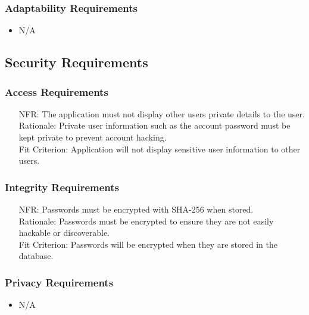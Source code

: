 \documentclass[12pt]{article}
\newcounter{nfrnum} %
\begin{document}
  \subsubsection{Adaptability Requirements}
    \noindent \begin{itemize}
		\item N/A
    \end{itemize}

\subsection{Security Requirements}
  \subsubsection{Access Requirements}
    \noindent \begin{itemize}
      \item[NFR\refstepcounter{nfrnum}\thenfrnum:]
        The application must not display other users private details to the user.
		\\ Rationale: Private user information such as the account password must be kept private to prevent account hacking.
		\\ Fit Criterion: Application will not display sensitive user information to other users.
    \end{itemize}
  \subsubsection{Integrity Requirements}
    \noindent \begin{itemize}
      \item[NFR\refstepcounter{nfrnum}\thenfrnum:]
       Passwords must be encrypted with SHA-256 when stored.
	   \\ Rationale: Passwords must be encrypted to ensure they are not easily hackable or discoverable.
	   \\ Fit Criterion: Passwords will be encrypted when they are stored in the database. 
    \end{itemize}

  \subsubsection{Privacy Requirements}
    \noindent \begin{itemize}
		\item N/A
    \end{itemize}
\end{document}
